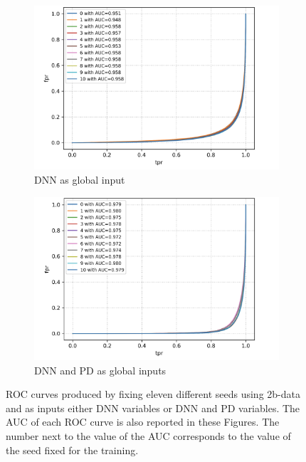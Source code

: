 \begin{figure}[hbt]
\centering
\begin{subfigure}{.5\textwidth}
  \centering
  \includegraphics[width=1.1\linewidth]{Images/7.S_B/Variability/2b data DNN.png}
  \caption{DNN as global input}
  \label{fig: 2b data DNN}
\end{subfigure}%
\begin{subfigure}{.5\textwidth}
  \centering
  \includegraphics[width=1.1\linewidth]{Images/7.S_B/Variability/2b data DNN and prob diff.png}
  \caption{DNN and PD as global inputs}
  \label{fig: 2b data DNN PD}
\end{subfigure}
\caption{ROC curves produced by fixing eleven different seeds using 2b-data and as inputs either DNN variables or DNN and PD variables. The AUC of each ROC curve is also reported in these Figures. The number next to the value of the AUC corresponds to the value of the seed fixed for the training.}
\label{fig: 2b data v ariability}
\end{figure}

